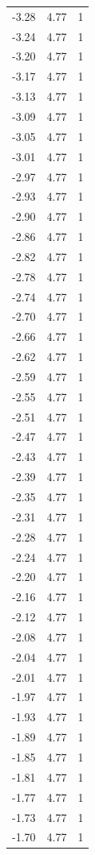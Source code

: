\begin{longtable}{lrr}
  -3.28 & 4.77 & 1 \\
  -3.24 & 4.77 & 1 \\
  -3.20 & 4.77 & 1 \\
  -3.17 & 4.77 & 1 \\
  -3.13 & 4.77 & 1 \\
  -3.09 & 4.77 & 1 \\
  -3.05 & 4.77 & 1 \\
  -3.01 & 4.77 & 1 \\
  -2.97 & 4.77 & 1 \\
  -2.93 & 4.77 & 1 \\
  -2.90 & 4.77 & 1 \\
  -2.86 & 4.77 & 1 \\
  -2.82 & 4.77 & 1 \\
  -2.78 & 4.77 & 1 \\
  -2.74 & 4.77 & 1 \\
  -2.70 & 4.77 & 1 \\
  -2.66 & 4.77 & 1 \\
  -2.62 & 4.77 & 1 \\
  -2.59 & 4.77 & 1 \\
  -2.55 & 4.77 & 1 \\
  -2.51 & 4.77 & 1 \\
  -2.47 & 4.77 & 1 \\
  -2.43 & 4.77 & 1 \\
  -2.39 & 4.77 & 1 \\
  -2.35 & 4.77 & 1 \\
  -2.31 & 4.77 & 1 \\
  -2.28 & 4.77 & 1 \\
  -2.24 & 4.77 & 1 \\
  -2.20 & 4.77 & 1 \\
  -2.16 & 4.77 & 1 \\
  -2.12 & 4.77 & 1 \\
  -2.08 & 4.77 & 1 \\
  -2.04 & 4.77 & 1 \\
  -2.01 & 4.77 & 1 \\
  -1.97 & 4.77 & 1 \\
  -1.93 & 4.77 & 1 \\
  -1.89 & 4.77 & 1 \\
  -1.85 & 4.77 & 1 \\
  -1.81 & 4.77 & 1 \\
  -1.77 & 4.77 & 1 \\
  -1.73 & 4.77 & 1 \\
  -1.70 & 4.77 & 1 \\

\end{longtable}

